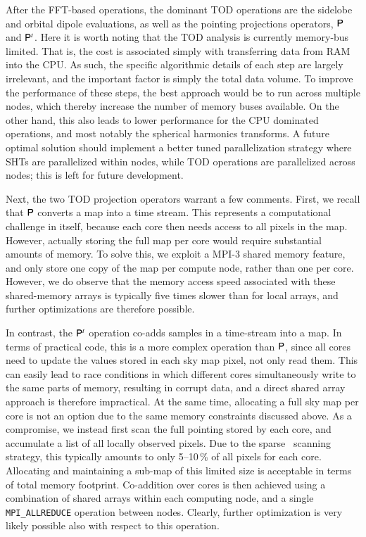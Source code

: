 \documentclass[twocolumn]{aa}
\renewcommand{\P}[0]{\tens{P}}
\begin{document}
After the FFT-based operations, the dominant TOD operations are the
sidelobe and orbital dipole evaluations, as well as the pointing
projections operators, $\P$ and $\P^t$. Here it is worth noting that
the TOD analysis is currently memory-bus limited. That is, the cost is
associated simply with transferring data from RAM into the CPU. As
such, the specific algorithmic details of each step are largely
irrelevant, and the important factor is simply the total data
volume. To improve the performance of these steps, the best approach
would be to run across multiple nodes, which thereby increase the
number of memory buses available. On the other hand, this also leads
to lower performance for the CPU dominated operations, and most
notably the spherical harmonics transforms. A future optimal solution
should implement a better tuned parallelization strategy where SHTs
are parallelized within nodes, while TOD operations are parallelized
across nodes; this is left for future development.

Next, the two TOD projection operators warrant a few comments. First,
we recall that $\P$ converts a map into a time stream. This represents
a computational challenge in itself, because each core then needs
access to all pixels in the map. However, actually storing the full
map per core would require substantial amounts of memory. To solve
this, we exploit a MPI-3 shared memory feature, and only store one
copy of the map per compute node, rather than one per core. However,
we do observe that the memory access speed associated with these
shared-memory arrays is typically five times slower than for local
arrays, and further optimizations are therefore possible.

In contrast, the $\P^t$ operation co-adds samples in a time-stream
into a map. In terms of practical code, this is a more complex
operation than $\P$, since all cores need to update the values stored
in each sky map pixel, not only read them. This can easily lead to
race conditions in which different cores simultaneously write to the
same parts of memory, resulting in corrupt data, and a direct shared
array approach is therefore impractical. At the same time, allocating
a full sky map per core is not an option due to the same memory
constraints discussed above. As a compromise, we instead first scan
the full pointing stored by each core, and accumulate a list of all
locally observed pixels. Due to the sparse \Planck\ scanning strategy,
this typically amounts to only 5--10\,\% of all pixels for each
core. Allocating and maintaining a sub-map of this limited size is
acceptable in terms of total memory footprint. Co-addition over cores
is then achieved using a combination of shared arrays within each
computing node, and a single \texttt{MPI\_ALLREDUCE} operation between
nodes. Clearly, further optimization is very likely possible also with
respect to this operation.
\end{document}
